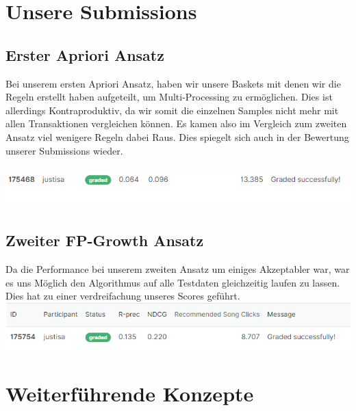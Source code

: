 \documentclass[12pt]{article}
\begin{document}
\newpage
\section{Unsere Submissions}

\subsection{Erster Apriori Ansatz}
Bei unserem ersten Apriori Ansatz, haben wir unsere Baskets mit denen wir die Regeln erstellt haben aufgeteilt, um Multi-Processing zu ermöglichen. Dies ist allerdings Kontraproduktiv, da wir somit die einzelnen Samples nicht mehr mit allen Transaktionen vergleichen können. Es kamen also im Vergleich zum zweiten Ansatz viel wenigere Regeln dabei Raus. Dies spiegelt sich auch in der Bewertung unserer Submissions wieder.\\\\
\includegraphics[scale=0.8]{firstSub.png}
\subsection{Zweiter FP-Growth Ansatz}
Da die Performance bei unserem zweiten Ansatz um einiges Akzeptabler war, war es uns Möglich den Algorithmus auf alle Testdaten gleichzeitig laufen zu lassen. Dies hat zu einer verdreifachung unseres Scores geführt.\\
\includegraphics[scale=0.8]{secondSub.png}


\section{Weiterführende Konzepte}
\end{document}
